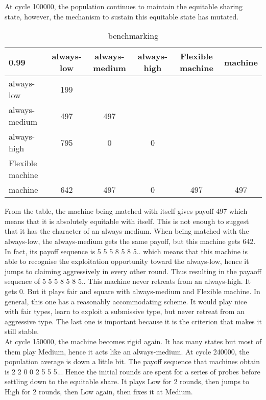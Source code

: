 \documentclass[12.5pt]{report}
\begin{document}
At cycle 100000, the population continues to maintain the equitable sharing state, however, the mechanism to sustain this equitable state has mutated. 

\begin{table}[h!]
\center
\begin{tabular}{l|ccccc}
\textbf{0.99}& always-low & always-medium & always-high & Flexible machine & machine\\
\hline
always-low    & 199 &     &    &   \\
always-medium & 497 & 497 &    & \\
always-high   & 795 &  0  & 0  & \\
Flexible machine  &     &     &    & \\
machine       & 642 &    497 & 0& 497 & 497 \\
\end{tabular}
\caption{benchmarking}
\end{table}

From the table, the machine being matched with itself gives payoff 497 which means that it is absolutely equitable with itself. This is not enough to suggest that it has the character of an always-medium. When being matched with the always-low, the always-medium gets the same payoff, but this machine gets 642. In fact, its payoff sequence is 5 5 5 8 5 8 5.. which means that this machine is able to recognise the exploitation opportunity toward the always-low, hence it jumps to claiming aggressively in every other round. Thus resulting in the payaoff sequence of 5 5 5 8 5 8 5.. This machine never retreats from an always-high. It gets 0. But it plays fair and square with always-medium and Flexible machine. In general, this one has a reasonably accommodating scheme. It would play nice with fair types, learn to exploit a submissive type, but never retreat from an aggressive type. The last one is important because it is the criterion that makes it still stable.\\

At cycle 150000, the machine becomes rigid again. It has many states but most of them play Medium, hence it acts like an always-medium. At cycle 240000, the population average is down a little bit. The payoff sequence that machines obtain is 2 2 0 0 2 5 5 5... Hence the initial rounds are spent for a series of probes before settling down to the equitable share. It plays Low for 2 rounds, then jumps to High for 2 rounds, then Low again, then fixes it at Medium.\\
\end{document}
